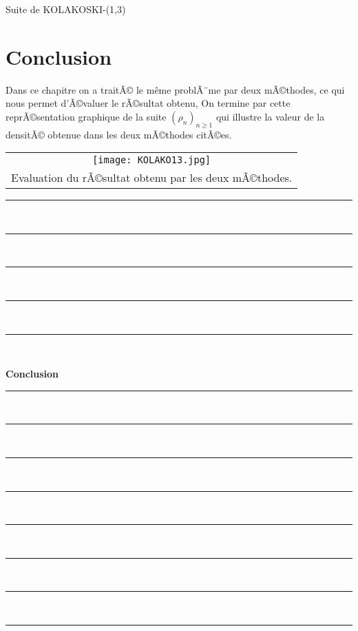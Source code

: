 \documentclass[12pt,a4paper,oneside]{book}
\begin{document}
\begin{titlepage}
\begin{chapter}{Suite de KOLAKOSKI-(1,3)}
\section{Conclusion}
\par Dans ce chapitre on a traitÃ© le m\^eme problÃ¨me par deux mÃ©thodes, ce qui nous permet d'Ã©valuer le rÃ©sultat obtenu, On termine par cette reprÃ©sentation graphique de la suite $(\rho_n)_{n \geq 1}$ qui illustre la valeur de la densitÃ© obtenue dans les deux mÃ©thodes citÃ©es.\\ 
\begin{center}
 \begin{tabular}{c} 
\texttt{[image: KOLAKO13.jpg]} \\ 
Evaluation du rÃ©sultat obtenu par les deux mÃ©thodes. 
\end{tabular}
 \end{center} 
\end{chapter}
\newpage                  
\rule{1\textwidth}{0pt}\\ 
\rule{1\textwidth}{0pt}\\ 
\rule{1\textwidth}{0pt}\\ 
\rule{1\textwidth}{0pt}\\
\rule{1\textwidth}{0pt}\\
    \begin{center}
          {\Huge \textbf{Conclusion}}
    \end{center}
\rule{1\textwidth}{0pt} \\ 
\rule{1\textwidth}{0pt} \\
 \rule{1\textwidth}{0pt} \\
 \rule{1\textwidth}{0pt} \\
  \rule{1\textwidth}{0pt} \\ 
  \rule{1\textwidth}{0pt} \\
   \rule{1\textwidth}{0pt} \\ 
   \rule{1\textwidth}{0pt} \\

\end{titlepage}
\end{document}
